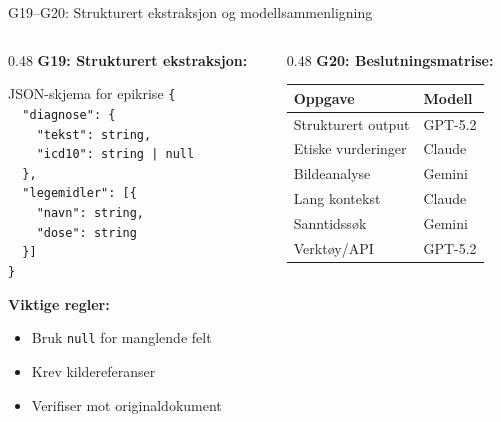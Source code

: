 \documentclass[aspectratio=169, 10pt]{beamer}
\begin{document}
\begin{frame}{G19--G20: Strukturert ekstraksjon og modellsammenligning}
    \begin{columns}[T]
        \begin{column}{0.48\textwidth}
            \textbf{G19: Strukturert ekstraksjon:}
            \footnotesize
            \begin{block}{\scriptsize JSON-skjema for epikrise}
                \scriptsize
                \texttt{\{} \\
                \texttt{~~"diagnose": \{} \\
                \texttt{~~~~"tekst": string,} \\
                \texttt{~~~~"icd10": string | null} \\
                \texttt{~~\},} \\
                \texttt{~~"legemidler": [\{} \\
                \texttt{~~~~"navn": string,} \\
                \texttt{~~~~"dose": string} \\
                \texttt{~~\}]} \\
                \texttt{\}}
            \end{block}
            
            \footnotesize
            \textbf{Viktige regler:}
            \begin{itemize}
                \item Bruk \texttt{null} for manglende felt
                \item Krev kildereferanser
                \item Verifiser mot originaldokument
            \end{itemize}
        \end{column}
        \begin{column}{0.48\textwidth}
            \textbf{G20: Beslutningsmatrise:}
            \scriptsize
            \begin{tabular}{ll}
                \toprule
                \textbf{Oppgave} & \textbf{Modell} \\
                \midrule
                Strukturert output & GPT-5.2 \\
                Etiske vurderinger & Claude \\
                Bildeanalyse & Gemini \\
                Lang kontekst & Claude \\
                Sanntidssøk & Gemini \\
                Verktøy/API & GPT-5.2 \\
                \bottomrule
            \end{tabular}
            

\end{column}
\end{columns}
\end{frame}
\end{document}
